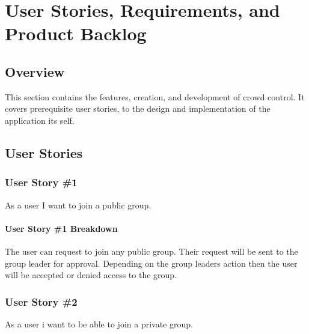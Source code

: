 
\chapter{User Stories,  Requirements, and Product Backlog}
\section{Overview}

This section contains the features, creation, and development of crowd control. It covers prerequisite user stories, to the design and implementation of the application its self.







\section{User Stories}

\subsection{User Story \#1 }
As a user I want to join a public group.

\subsubsection{User Story \#1 Breakdown}
The user can request to join any public group.  Their request will be sent to the group leader for approval.  Depending on the group leaders action then the user will be accepted or denied access to the group. 

\subsection{User Story \#2 }
As a user i want to be able to join a private group.

